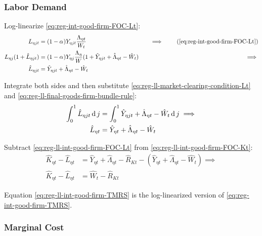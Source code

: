 \documentclass[../thesis.tex]{subfiles}
\begin{document}

\subsubsection*{Labor Demand}

Log-linearize \ref{eq:reg-int-good-firm-FOC-Lt}:
\begin{alignat}{2}
	L_{\eta jt} &= (1-{\alpha_{}}) Y_{\eta jt} \frac{\Lambda_{\eta t}}{W_{t}} &\implies \tag{\ref{eq:reg-int-good-firm-FOC-Lt}} \\
	L_{\eta j} (1+ \hat{L}_{\eta jt}) &= (1-{\alpha_{}}) Y_{\eta j} \frac{\Lambda_{\eta}}{W} (1+ \hat{Y}_{\eta jt} +\hat{\Lambda}_{\eta t} -\hat{W}_{t}) \quad &\implies \nonumber \\
	\hat{L}_{\eta jt} &= \hat{Y}_{\eta jt} +\hat{\Lambda}_{\eta t} -\hat{W}_{t} \nonumber
\end{alignat}

Integrate both sides and then substitute \ref{eq:reg-ll-market-clearing-condition-Lt} and \ref{eq:reg-ll-final-goods-firm-bundle-rule}:
\begin{align}
	\int_{0}^{1} \hat{L}_{\eta jt} \operatorname{d} j &= \int_{0}^{1} \hat{Y}_{\eta jt} + \hat{\Lambda}_{\eta t} - \hat{W}_{t} \operatorname{d} j \implies \nonumber \\
	\hat{L}_{\eta t} &= \hat{Y}_{\eta t} + \hat{\Lambda}_{\eta t} - \hat{W}_{t}
	\label{eq:reg-ll-int-good-firm-FOC-Lt}
\end{align}

Subtract \ref{eq:reg-ll-int-good-firm-FOC-Lt} from \ref{eq:reg-ll-int-good-firm-FOC-Kt}:
\begin{align}
	\hat{K}_{\eta t} - \hat{L}_{\eta t} &= \hat{Y}_{\eta t} + \hat{\Lambda}_{\eta t} - \hat{R}_{K t} - (\hat{Y}_{\eta t} + \hat{\Lambda}_{\eta t} - \hat{W}_{t}) \implies \nonumber \\
	\hat{K}_{\eta t} - \hat{L}_{\eta t} &= \hat{W}_{t} - \hat{R}_{K t} \label{eq:reg-ll-int-good-firm-TMRS}
\end{align}

Equation \ref{eq:reg-ll-int-good-firm-TMRS} is the log-linearized version of \ref{eq:reg-int-good-firm-TMRS}.


\subsubsection*{Marginal Cost}
\end{document}

